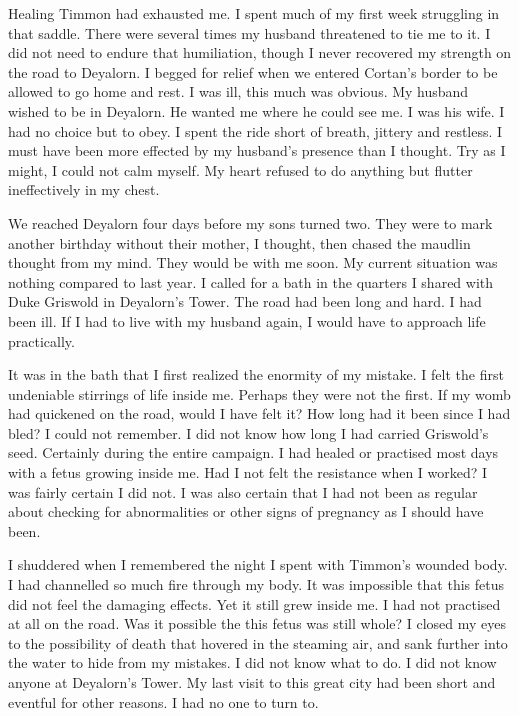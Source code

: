 \documentclass{article}
\begin{document}
Healing Timmon had exhausted me. I spent much of my first week struggling in that saddle. There were several times my husband threatened to tie me to it. I did not need to endure that humiliation, though I never recovered my strength on the road to Deyalorn. I begged for relief when we entered Cortan's border to be allowed to go home and rest. I was ill, this much was obvious. My husband wished to be in Deyalorn. He wanted me where he could see me. I was his wife. I had no choice but to obey. I spent the ride short of breath, jittery and restless. I must have been more effected by my husband's presence than I thought. Try as I might, I could not calm myself. My heart refused to do anything but flutter ineffectively in my chest. 

We reached Deyalorn four days before my sons turned two. They were to mark another birthday without their mother, I thought, then chased the maudlin thought from my mind. They would be with me soon. My current situation was nothing compared to last year. I called for a bath in the quarters I shared with Duke Griswold in Deyalorn's Tower. The road had been long and hard. I had been ill. If I had to live with my husband again, I would have to approach life practically.

It was in the bath that I first realized the enormity of my mistake. I felt the first undeniable stirrings of life inside me. Perhaps they were not the first. If my womb had quickened on the road, would I have felt it? How long had it been since I had bled? I could not remember. I did not know how long I had carried Griswold's seed. Certainly during the entire campaign. I had healed or practised most days with a fetus growing inside me. Had I not felt the resistance when I worked? I was fairly certain I did not. I was also certain that I had not been as regular about checking for abnormalities or other signs of pregnancy as I should have been. 

I shuddered when I remembered the night I spent with Timmon's wounded body. I had channelled so much fire through my body. It was impossible that this fetus did not feel the damaging effects. Yet it still grew inside me. I had not practised at all on the road. Was it possible the this fetus was still whole? I closed my eyes to the possibility of death that hovered in the steaming air, and sank further into the water to hide from my mistakes. I did not know what to do. I did not know anyone at Deyalorn's Tower. My last visit to this great city had been short and eventful for other reasons. I had no one to turn to.
\end{document}
